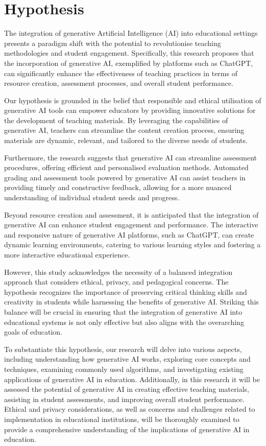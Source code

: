 \documentclass[a4paper,12pt]{report}
\begin{document}
\newpage
\section{Hypothesis} \label{sect:hypothesis}
\hspace{10mm} The integration of generative Artificial Intelligence (AI) into educational settings presents a paradigm shift with the potential to revolutionise teaching methodologies and student engagement. Specifically, this research proposes that the incorporation of generative AI, exemplified by platforms such as ChatGPT, can significantly enhance the effectiveness of teaching practices in terms of resource creation, assessment processes, and overall student performance.

Our hypothesis is grounded in the belief that responsible and ethical utilisation of generative AI tools can empower educators by providing innovative solutions for the development of teaching materials. By leveraging the capabilities of generative AI, teachers can streamline the content creation process, ensuring materials are dynamic, relevant, and tailored to the diverse needs of students.

Furthermore, the research suggests that generative AI can streamline assessment procedures, offering efficient and personalised evaluation methods. Automated grading and assessment tools powered by generative AI can assist teachers in providing timely and constructive feedback, allowing for a more nuanced understanding of individual student needs and progress.

Beyond resource creation and assessment, it is anticipated that the integration of generative AI can enhance student engagement and performance. The interactive and responsive nature of generative AI platforms, such as ChatGPT, can create dynamic learning environments, catering to various learning styles and fostering a more interactive educational experience.

However, this study acknowledges the necessity of a balanced integration approach that considers ethical, privacy, and pedagogical concerns. The hypothesis recognizes the importance of preserving critical thinking skills and creativity in students while harnessing the benefits of generative AI. Striking this balance will be crucial in ensuring that the integration of generative AI into educational systems is not only effective but also aligns with the overarching goals of education.

To substantiate this hypothesis, our research will delve into various aspects, including understanding how generative AI works, exploring core concepts and techniques, examining commonly used algorithms, and investigating existing applications of generative AI in education. Additionally, in this research it will be assessed the potential of generative AI in creating effective teaching materials, assisting in student assessments, and improving overall student performance. Ethical and privacy considerations, as well as concerns and challenges related to implementation in educational institutions, will be thoroughly examined to provide a comprehensive understanding of the implications of generative AI in education.
\end{document}

